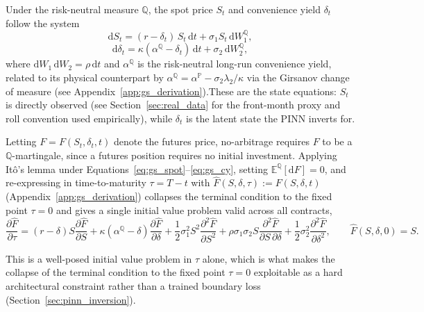 \documentclass[11pt, a4paper]{article}
\newcommand{\convyield}{\delta}             %
\newcommand{\meanrev}{\kappa}               %
\newcommand{\longrun}{\alpha}               %
\begin{document}
Under the risk-neutral measure $\mathbb{Q}$, the spot price $S_t$ and convenience
yield $\convyield_t$ follow the system
\begin{equation}
  \label{eq:gs_spot}
  \mathrm{d}S_t = (r - \convyield_t)\,S_t\,\mathrm{d}t
                + \sigma_1 S_t\,\mathrm{d}W_1^{\mathbb{Q}},
\end{equation}
\begin{equation}
  \label{eq:gs_cy}
  \mathrm{d}\convyield_t = \meanrev(\longrun^{\mathbb{Q}} - \convyield_t)\,\mathrm{d}t + \sigma_2\,\mathrm{d}W_2^{\mathbb{Q}},
\end{equation}
\noindent
where $\mathrm{d}W_1\,\mathrm{d}W_2 = \rho\,\mathrm{d}t$ and $\longrun^{\mathbb{Q}}$ is the
risk-neutral long-run convenience yield, related to its physical counterpart by
$\longrun^{\mathbb{Q}} = \longrun^{\mathbb{P}} - \sigma_2\lambda_2/\meanrev$ via the
Girsanov change of measure (see Appendix~\ref{app:gs_derivation}).These are the state equations: $S_t$ is directly observed (see Section~\ref{sec:real_data} for the front-month proxy and roll convention used empirically), while $\convyield_t$ is the latent state the PINN inverts for.

Letting $F = F(S_t, \convyield_t, t)$ denote the futures price, no-arbitrage requires
$F$ to be a $\mathbb{Q}$-martingale, since a futures position requires no initial
investment. Applying It\^{o}'s lemma under Equations~\ref{eq:gs_spot}--\ref{eq:gs_cy},
setting $\mathbb{E}^{\mathbb{Q}}[\mathrm{d}F] = 0$, and re-expressing in
time-to-maturity $\tau = T - t$ with
$\hat{F}(S, \convyield, \tau) := F(S, \convyield, t)$ (Appendix~\ref{app:gs_derivation})
collapses the terminal condition to the fixed point $\tau = 0$ and gives a single
initial value problem valid across all contracts,
\begin{equation}
  \label{eq:gs_pde_tau}
  \frac{\partial \hat{F}}{\partial \tau} = (r - \convyield)S\frac{\partial \hat{F}}{\partial S}
  + \meanrev(\longrun^{\mathbb{Q}} - \convyield)\frac{\partial \hat{F}}{\partial \convyield}
  + \frac{1}{2}\sigma_1^2 S^2 \frac{\partial^2 \hat{F}}{\partial S^2}
  + \rho\sigma_1\sigma_2 S \frac{\partial^2 \hat{F}}{\partial S\,\partial \convyield}
  + \frac{1}{2}\sigma_2^2 \frac{\partial^2 \hat{F}}{\partial \convyield^2},
  \qquad \hat{F}(S, \convyield, 0) = S.
\end{equation}

This is a well-posed initial value problem in $\tau$ alone, which is what makes the
collapse of the terminal condition to the fixed point $\tau = 0$ exploitable as a hard
architectural constraint rather than a trained boundary loss
(Section~\ref{sec:pinn_inversion}).
\end{document}
